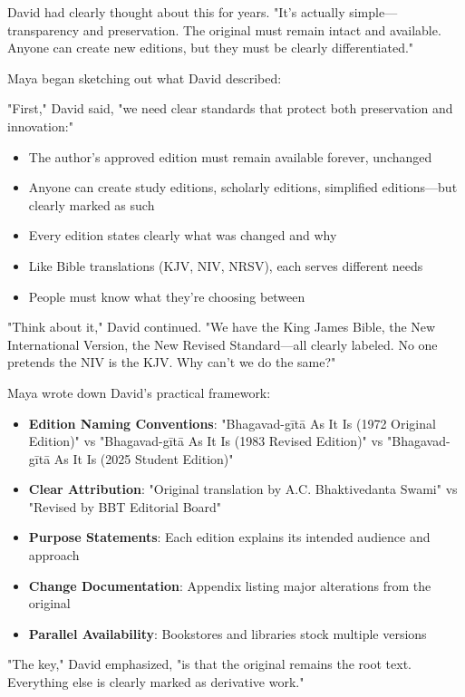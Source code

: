 \documentclass[12pt,twoside]{book}
\begin{document}
David had clearly thought about this for years. "It's actually simple—transparency and preservation. The original must remain intact and available. Anyone can create new editions, but they must be clearly differentiated."

Maya began sketching out what David described:

"First," David said, "we need clear standards that protect both preservation and innovation:"

\begin{itemize}
\item The author's approved edition must remain available forever, unchanged
\item Anyone can create study editions, scholarly editions, simplified editions—but clearly marked as such
\item Every edition states clearly what was changed and why
\item Like Bible translations (KJV, NIV, NRSV), each serves different needs
\item People must know what they're choosing between
\end{itemize}

"Think about it," David continued. "We have the King James Bible, the New International Version, the New Revised Standard—all clearly labeled. No one pretends the NIV is the KJV. Why can't we do the same?"

Maya wrote down David's practical framework:

\begin{itemize}
\item \textbf{\textbf{Edition Naming Conventions}}: "Bhagavad-gītā As It Is (1972 Original Edition)" vs "Bhagavad-gītā As It Is (1983 Revised Edition)" vs "Bhagavad-gītā As It Is (2025 Student Edition)"
\item \textbf{\textbf{Clear Attribution}}: "Original translation by A.C. Bhaktivedanta Swami" vs "Revised by BBT Editorial Board"
\item \textbf{\textbf{Purpose Statements}}: Each edition explains its intended audience and approach
\item \textbf{\textbf{Change Documentation}}: Appendix listing major alterations from the original
\item \textbf{\textbf{Parallel Availability}}: Bookstores and libraries stock multiple versions
\end{itemize}

"The key," David emphasized, "is that the original remains the root text. Everything else is clearly marked as derivative work."
\end{document}
